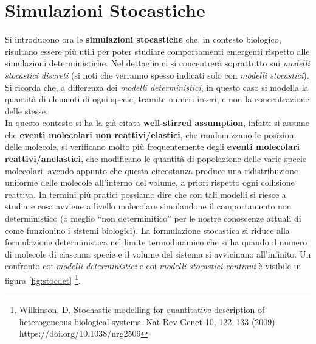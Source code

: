 \documentclass[a4paper,12pt, oneside]{book}
\begin{document}
\section{Simulazioni Stocastiche}
Si introducono ora le \textbf{simulazioni stocastiche} che, in contesto
biologico, risultano essere più utili per poter studiare comportamenti emergenti
rispetto alle simulazioni deterministiche. Nel dettaglio ci si concentrerà
soprattutto sui \textit{modelli stocastici discreti} (si noti che verranno
spesso indicati solo con \textit{modelli stocastici}).\\
Si ricorda che, a differenza dei \textit{modelli deterministici}, in questo caso
si modella la quantità di elementi di ogni specie, tramite numeri interi, e non
la concentrazione delle stesse.\\ 
In questo contesto si ha la già citata \textbf{well-stirred assumption},
infatti si
assume che\textbf{ eventi molecolari non reattivi/elastici}, che randomizzano le
posizioni delle molecole, si verificano molto più frequentemente degli
\textbf{eventi molecolari reattivi/anelastici}, che modificano le quantità di
popolazione delle varie specie molecolari, avendo appunto che questa circostanza
produce una ridistribuzione uniforme delle molecole all'interno del volume,
a priori rispetto ogni collisione reattiva. In termini più pratici possiamo dire
che con tali modelli si riesce a studiare cosa avviene a livello molecolare
simulandone il comportamento non deterministico (o meglio ``non determinitico''
per le nostre conoscenze attuali di come funzionino i sistemi biologici). La
formulazione stocastica si riduce 
alla formulazione deterministica nel limite termodinamico che si ha quando il
numero di molecole di ciascuna specie e il volume del sistema si avvicinano
all'infinito. Un confronto coi \textit{modelli deterministici} e coi
\textit{modelli stocastici continui} è visibile in figura
\ref{fig:stocdet} \footnote{Wilkinson, D. Stochastic modelling for quantitative
  description of heterogeneous biological systems. Nat Rev Genet 10, 122–133
  (2009). https://doi.org/10.1038/nrg2509}.
\end{document}
